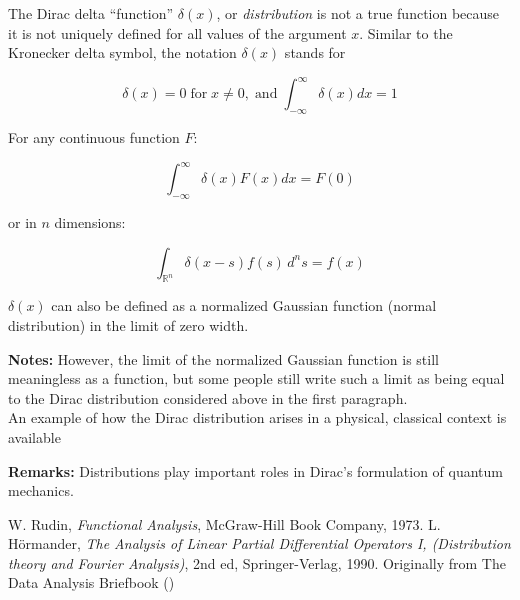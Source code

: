 \documentclass[12pt]{article}
\begin{document}
The Dirac delta ``function'' $\delta(x)$, or \emph{distribution} is not a true function because it is not uniquely defined for all values of the argument $x$. Similar to the Kronecker delta symbol, the notation $\delta(x)$ stands for

$$ \delta(x) = 0 \;\text{for}\; x \ne 0, \;\text{and}\; \int_{-\infty}^\infty \delta(x) dx = 1 $$

For any continuous function $F$:

$$ \int_{-\infty}^\infty \delta(x) F(x)dx = F(0) $$

or in $n$ dimensions:

$$\int_{\mathbb{R}^n} \delta(x - s)f(s) \, d^ns = f(x)$$

$\delta(x)$ can also be defined as a normalized Gaussian function (normal distribution) in the limit of zero width.

\textbf{Notes:}
However, the limit of the normalized Gaussian function is still meaningless as a function, but some people still write such a limit as being equal to the Dirac distribution considered above in the first paragraph. \\
An example of how the Dirac distribution arises in a physical, classical context is available 

{\bf Remarks:}
Distributions play important roles in Dirac's formulation of quantum mechanics.

\begin{thebibliography}{9}
W. Rudin, {\em Functional Analysis},
McGraw-Hill Book Company, 1973.
L. H\"ormander, {\em The Analysis of Linear Partial Differential Operators I,
(Distribution theory and Fourier Analysis)}, 2nd ed, Springer-Verlag, 1990.
Originally from The Data Analysis Briefbook
()
\end{thebibliography}
\end{document}
